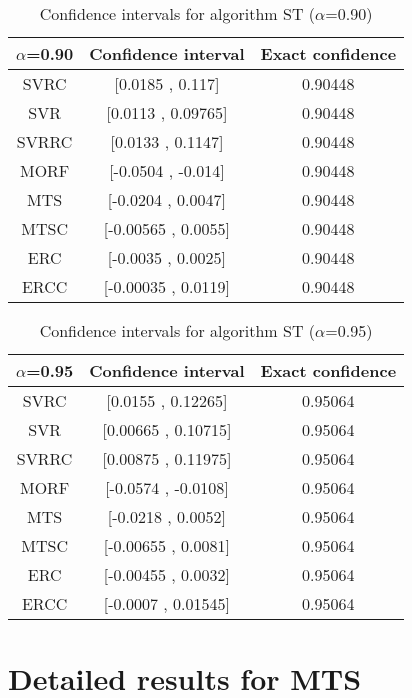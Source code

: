 \documentclass[a4paper,10pt]{article}
\begin{document}
\begin{table}[!htp]
\centering\small
\begin{tabular}{
|c|c|c|}
\hline
 $\alpha$=0.90 & Confidence interval & Exact confidence \\ \hline 
SVRC & [0.0185 , 0.117] & 0.90448\\ \hline 
SVR & [0.0113 , 0.09765] & 0.90448\\ \hline 
SVRRC & [0.0133 , 0.1147] & 0.90448\\ \hline 
MORF & [-0.0504 , -0.014] & 0.90448\\ \hline 
MTS & [-0.0204 , 0.0047] & 0.90448\\ \hline 
MTSC & [-0.00565 , 0.0055] & 0.90448\\ \hline 
ERC & [-0.0035 , 0.0025] & 0.90448\\ \hline 
ERCC & [-0.00035 , 0.0119] & 0.90448\\ \hline 

\end{tabular}
\caption{Confidence intervals for algorithm ST ($\alpha$=0.90)}
\end{table}
\begin{table}[!htp]
\centering\small
\begin{tabular}{
|c|c|c|}
\hline
 $\alpha$=0.95 & Confidence interval & Exact confidence \\ \hline 
SVRC & [0.0155 , 0.12265] & 0.95064\\ \hline 
SVR & [0.00665 , 0.10715] & 0.95064\\ \hline 
SVRRC & [0.00875 , 0.11975] & 0.95064\\ \hline 
MORF & [-0.0574 , -0.0108] & 0.95064\\ \hline 
MTS & [-0.0218 , 0.0052] & 0.95064\\ \hline 
MTSC & [-0.00655 , 0.0081] & 0.95064\\ \hline 
ERC & [-0.00455 , 0.0032] & 0.95064\\ \hline 
ERCC & [-0.0007 , 0.01545] & 0.95064\\ \hline 

\end{tabular}
\caption{Confidence intervals for algorithm ST ($\alpha$=0.95)}
\end{table}

 \clearpage 


\section{Detailed results for MTS}
\end{document}
